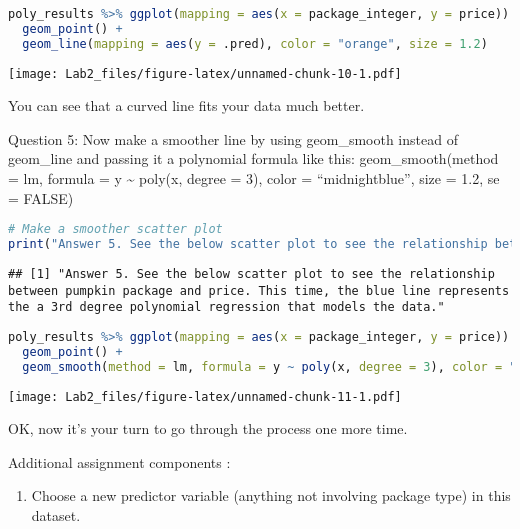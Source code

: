 \documentclass[
]{article}
\providecommand{\tightlist}{%
  \setlength{\itemsep}{0pt}\setlength{\parskip}{0pt}}
\begin{document}
\begin{lstlisting}[language=R]
poly_results %>% ggplot(mapping = aes(x = package_integer, y = price)) +
  geom_point() +
  geom_line(mapping = aes(y = .pred), color = "orange", size = 1.2)
\end{lstlisting}

\texttt{[image: Lab2\_files/figure-latex/unnamed-chunk-10-1.pdf]}

You can see that a curved line fits your data much better.

Question 5: Now make a smoother line by using geom\_smooth instead of
geom\_line and passing it a polynomial formula like this:
geom\_smooth(method = lm, formula = y \textasciitilde{} poly(x, degree =
3), color = ``midnightblue'', size = 1.2, se = FALSE)

\begin{lstlisting}[language=R]
# Make a smoother scatter plot 
print("Answer 5. See the below scatter plot to see the relationship between pumpkin package and price. This time, the blue line represents the a 3rd degree polynomial regression that models the data.")
\end{lstlisting}

\begin{lstlisting}
## [1] "Answer 5. See the below scatter plot to see the relationship between pumpkin package and price. This time, the blue line represents the a 3rd degree polynomial regression that models the data."
\end{lstlisting}

\begin{lstlisting}[language=R]
poly_results %>% ggplot(mapping = aes(x = package_integer, y = price)) +
  geom_point() +
  geom_smooth(method = lm, formula = y ~ poly(x, degree = 3), color = "midnightblue", size = 1.2, se = FALSE)
\end{lstlisting}

\texttt{[image: Lab2\_files/figure-latex/unnamed-chunk-11-1.pdf]}

OK, now it's your turn to go through the process one more time.

Additional assignment components :

\begin{enumerate}
\def\labelenumi{\arabic{enumi}.}
\setcounter{enumi}{5}
\tightlist
\item
  Choose a new predictor variable (anything not involving package type)
  in this dataset.
\end{enumerate}
\end{document}

